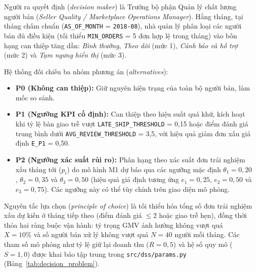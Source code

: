 \documentclass[a4paper]{article}
\begin{document}
Người ra quyết định (\textit{decision maker}) là Trưởng bộ phận Quản lý chất lượng người bán (\textit{Seller Quality / Marketplace Operations Manager}). Hằng tháng, tại tháng chấm chuẩn (\texttt{AS\_OF\_MONTH} = \texttt{2018-08}), nhà quản lý phân loại các người bán đủ điều kiện (tối thiểu \texttt{MIN\_ORDERS} = 5 đơn hợp lệ trong tháng) vào bốn hạng can thiệp tăng dần: \textit{Bình thường}, \textit{Theo dõi} (mức 1), \textit{Cảnh báo và hỗ trợ} (mức 2) và \textit{Tạm ngưng hiển thị} (mức 3).

Hệ thống đối chiếu ba nhóm phương án (\textit{alternatives}):
\begin{itemize}
    \item \textbf{P0 (Không can thiệp):} Giữ nguyên hiện trạng của toàn bộ người bán, làm mốc so sánh.
    \item \textbf{P1 (Ngưỡng KPI cố định):} Can thiệp theo hiệu suất quá khứ, kích hoạt khi tỷ lệ bàn giao trễ vượt \texttt{LATE\_SHIP\_THRESHOLD} = 0,15 hoặc điểm đánh giá trung bình dưới \texttt{AVG\_REVIEW\_THRESHOLD} = 3,5, với hiệu quả giảm đơn xấu giả định \texttt{E\_P1} = 0,50.
    \item \textbf{P2 (Ngưỡng xác suất rủi ro):} Phân hạng theo xác suất đơn trải nghiệm xấu tháng tới ($p_i$) do mô hình M1 dự báo qua các ngưỡng mặc định $\theta_1 = 0,20$, $\theta_2 = 0,35$ và $\theta_3 = 0,50$ (hiệu quả giả định tương ứng $e_1 = 0,25$, $e_2 = 0,50$ và $e_3 = 0,75$). Các ngưỡng này có thể tùy chỉnh trên giao diện mô phỏng.
\end{itemize}

Nguyên tắc lựa chọn (\textit{principle of choice}) là tối thiểu hóa tổng số đơn trải nghiệm xấu dự kiến ở tháng tiếp theo (điểm đánh giá $\le 2$ hoặc giao trễ hẹn), đồng thời thỏa hai ràng buộc vận hành: tỷ trọng GMV ảnh hưởng không vượt quá $X = 10\%$ và số người bán xử lý không vượt quá $N = 40$ người mỗi tháng. Các tham số mô phỏng như tỷ lệ giữ lại doanh thu ($R = 0,5$) và hệ số quy mô ($S = 1,0$) được khai báo tập trung trong \texttt{src/dss/params.py} (Bảng~\ref{tab:decision_problem}).
\end{document}
